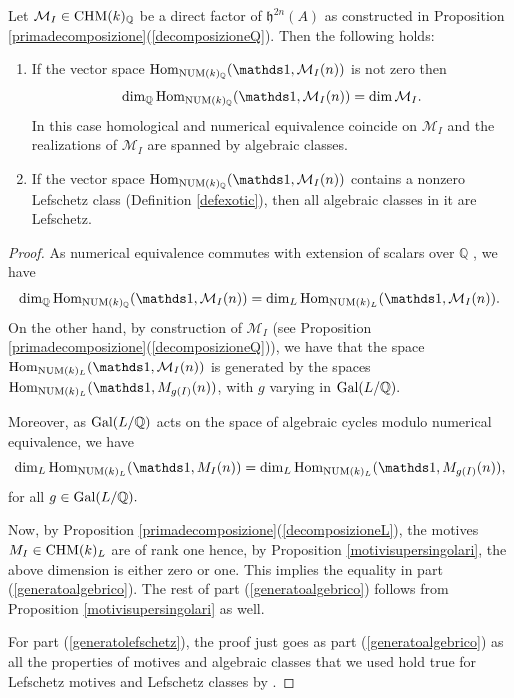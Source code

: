 \begin{proposition}
\notready\label{talvez}
Let  $\mathcal{M}_I \in \mathrm{CHM} (k)_{\mathbb{Q}}$ be a  direct factor of $\mathfrak{h}^{2n}(A)$ as constructed in Proposition \ref{primadecomposizione}(\ref{decomposizioneQ}). Then the following holds:
\begin{enumerate}
\item\label{generatoalgebrico} If the vector space $\Hom_{\NUM(k)_\Q}(\one, \mathcal{M}_I (n))$ is not zero then
\[\dim_\Q \Hom_{\NUM(k)_\Q}(\one, \mathcal{M}_I (n)) = \dim \mathcal{M}_I.\]
In this case homological and numerical equivalence coincide on $ \mathcal{M}_I$ and the realizations of $ \mathcal{M}_I$ are spanned by algebraic classes.
\item\label{generatolefschetz}   If the vector space $\Hom_{\NUM(k)_\Q}(\one, \mathcal{M}_I (n))$ contains a nonzero Lefschetz class (Definition \ref{defexotic}), then all algebraic  classes in
it are Lefschetz.
\end{enumerate}
\end{proposition}
\begin{proof}
As numerical equivalence commutes with  extension of scalars over $\mathbb{Q}$ \cite[Proposition 3.2.7.1]{Andmot}, we have \[\dim_\Q \Hom_{\NUM(k)_\Q}(\one, \mathcal{M}_I (n)) = \dim_L \Hom_{\NUM(k)_L}(\one, \mathcal{M}_I (n)).\]
 On the other hand, by construction of $\mathcal{M}_I$ (see Proposition \ref{primadecomposizione}(\ref{decomposizioneQ})), we have that the space $\Hom_{\NUM(k)_L}(\one,\mathcal{M}_I(n))$ is generated by the spaces $\Hom_{\NUM(k)_L}(\one,M_{g(I)}(n))$, with $g$ varying in $\textnormal{Gal}(L/\mathbb{Q}).$

 Moreover, as $\textnormal{Gal}(L/\mathbb{Q})$  acts on the space of algebraic cycles modulo numerical equivalence, we have
 \[\dim_L \Hom_{\NUM(k)_L}(\one,M_{I}(n)) = \dim_L \Hom_{\NUM(k)_L}(\one,M_{g(I)}(n)),\] for all $g\in \textnormal{Gal}(L/\mathbb{Q}).$

 Now, by Proposition \ref{primadecomposizione}(\ref{decomposizioneL}), the motives $M_{I} \in \mathrm{CHM} (k)_{L}$ are of rank one hence, by Proposition \ref{motivisupersingolari}, the above  dimension is either zero or one. This implies the equality in part (\ref{generatoalgebrico}). The rest of part (\ref{generatoalgebrico}) follows from Proposition \ref{motivisupersingolari} as well.


 For part (\ref{generatolefschetz}), the proof just goes as part (\ref{generatoalgebrico}) as all the properties of motives and algebraic classes that we used hold true for Lefschetz motives and Lefschetz classes by   \cite[p. 640]{Milnelef}.
\end{proof}
